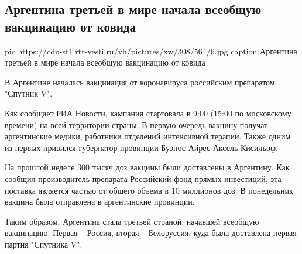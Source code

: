  
 
 
 
 
 
\subsection{Аргентина третьей в мире начала всеобщую вакцинацию от ковида}
\label{sec:29_12_2020.news.ru.vesti.1.argentina_covid_vaccine_sputnik_v}


\ifcmt
  pic https://cdn-st1.rtr-vesti.ru/vh/pictures/xw/308/564/6.jpg
	caption Аргентина третьей в мире начала всеобщую вакцинацию от ковида
\fi

В Аргентине началась вакцинация от коронавируса российским препаратом "Спутник
V".

Как сообщает РИА Новости, кампания стартовала в 9:00 (15:00
по московскому времени) на всей территории страны. В первую очередь вакцину
получат аргентинские медики, работники отделений интенсивной терапии. Также
одним из первых привился губернатор провинции Буэнос-Айрес Аксель Кисильоф.

На прошлой неделе 300 тысяч доз вакцины были доставлены в Аргентину. Как
сообщил производитель препарата Российский фонд прямых инвестиций, эта поставка
является частью от общего объема в 10 миллионов доз. В понедельник вакцина была
отправлена в аргентинские провинции.

Таким образом, Аргентина стала третьей страной, начавшей всеобщую вакцинацию.
Первая – Россия, вторая – Белоруссия, куда была доставлена первая партия
"Спутника V".

